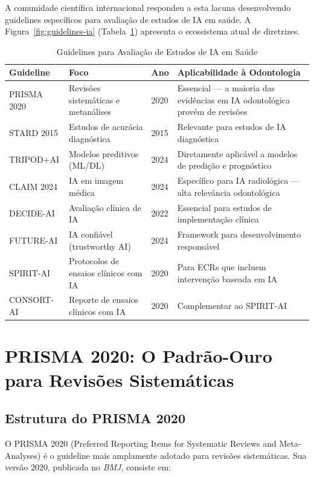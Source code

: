 A comunidade científica internacional respondeu a esta lacuna desenvolvendo guidelines específicos para avaliação de estudos de IA em saúde. A Figura~\ref{fig:guidelines-ia} (Tabela~\ref{tab:guidelines-ia}) apresenta o ecossistema atual de diretrizes.

\begin{table}[H]
  \centering
  \caption{Guidelines para Avaliação de Estudos de IA em Saúde}
  \label{tab:guidelines-ia}
  \begin{tabularx}{\textwidth}{p{2.5cm}Xp{2cm}p{2cm}}
    \toprule
    \textbf{Guideline} & \textbf{Foco} & \textbf{Ano} & \textbf{Aplicabilidade à Odontologia} \\
    \midrule
    PRISMA 2020 & Revisões sistemáticas e metanálises & 2020 & Essencial — a maioria das evidências em IA odontológica provém de revisões \\
    STARD 2015 & Estudos de acurácia diagnóstica & 2015 & Relevante para estudos de IA diagnóstica \\
    TRIPOD+AI & Modelos preditivos (ML/DL) & 2024 & Diretamente aplicável a modelos de predição e prognóstico \\
    CLAIM 2024 & IA em imagem médica & 2024 & Específico para IA radiológica — alta relevância odontológica \\
    DECIDE-AI & Avaliação clínica de IA & 2022 & Essencial para estudos de implementação clínica \\
    FUTURE-AI & IA confiável (trustworthy AI) & 2024 & Framework para desenvolvimento responsável \\
    SPIRIT-AI & Protocolos de ensaios clínicos com IA & 2020 & Para ECRs que incluem intervenção baseada em IA \\
    CONSORT-AI & Reporte de ensaios clínicos com IA & 2020 & Complementar ao SPIRIT-AI \\
    \bottomrule
  \end{tabularx}
\end{table}

\section{PRISMA 2020: O Padrão-Ouro para Revisões Sistemáticas}

\subsection{Estrutura do PRISMA 2020}

O PRISMA 2020 (Preferred Reporting Items for Systematic Reviews and Meta-Analyses)  é o guideline mais amplamente adotado para revisões sistemáticas. Sua versão 2020, publicada no \textit{BMJ}, consiste em:

